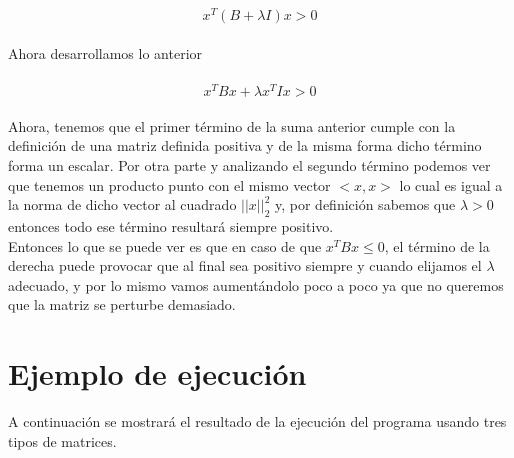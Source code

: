 \documentclass[12pt]{article}
\begin{document}
\begin{align}
\label{eqn:eqlabel}
\begin{split}
x^T (B + \lambda I) x > 0
\end{split}
\end{align}

Ahora desarrollamos lo anterior

\begin{align}
\label{eqn:eqlabel}
\begin{split}
x^T B x + \lambda x^T I x > 0
\end{split}
\end{align}

Ahora, tenemos que el primer término de la suma anterior cumple con la definición de una matriz definida positiva y de la misma forma dicho término forma un escalar. Por otra parte y analizando el segundo término podemos ver que tenemos un producto punto con el mismo vector $<x, x>$ lo cual es igual a la norma de dicho vector al cuadrado $||x||^2_2$ y, por definición sabemos que $\lambda > 0$ entonces todo ese término resultará siempre positivo.\\
Entonces lo que se puede ver es que en caso de que $x^T B x \leq 0$, el término de la derecha puede provocar que al final sea positivo siempre y cuando elijamos el $\lambda$ adecuado, y por lo mismo vamos aumentándolo poco a poco ya que no queremos que la matriz se perturbe demasiado.

\section{Ejemplo de ejecución}
A continuación se mostrará el resultado de la ejecución del programa usando tres tipos de matrices.

\begin{figure}[H]
	\centering
	\hfill
\end{figure}
\end{document}

